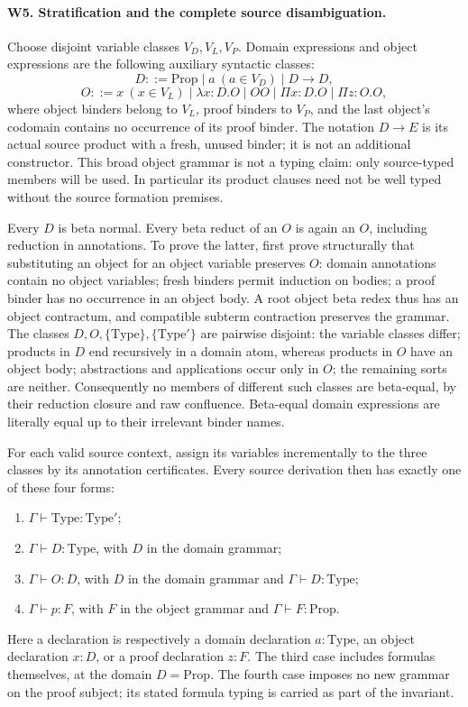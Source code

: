 \paragraph{W5. Stratification and the complete source disambiguation.}
Choose disjoint variable classes \(V_D,V_L,V_P\). Domain expressions and
object expressions are the following auxiliary syntactic classes:
\[
 D ::= \mathrm{Prop}\mid a\ (a\in V_D)\mid D\to D,
\]
\[
 O ::= x\ (x\in V_L)\mid\lambda x:D.O\mid OO
       \mid\Pi x:D.O\mid\Pi z:O.O,
\]
where object binders belong to \(V_L\), proof binders to \(V_P\), and
the last object's codomain contains no occurrence of its proof binder.
The notation \(D\to E\) is its actual source product with a fresh,
unused binder; it is not an additional constructor. This broad object
grammar is not a typing claim: only source-typed members will be used.
In particular its product clauses need not be well typed without the
source formation premises.

Every \(D\) is beta normal. Every beta reduct of an \(O\) is again an
\(O\), including reduction in annotations. To prove the latter, first
prove structurally that substituting an object for an object variable
preserves \(O\): domain annotations contain no object variables;
fresh binders permit induction on bodies; a proof binder has no occurrence
in an object body. A root object beta redex thus has an object contractum,
and compatible subterm contraction preserves the grammar. The classes
\(D,O,\{\mathrm{Type}\},\{\mathrm{Type}'\}\) are pairwise disjoint:
the variable classes differ; products in \(D\) end recursively in a
domain atom, whereas products in \(O\) have an object body; abstractions
and applications occur only in \(O\); the remaining sorts are neither.
Consequently no members of different such classes are beta-equal, by
their reduction closure and raw confluence. Beta-equal domain expressions
are literally equal up to their irrelevant binder names.

For each valid source context, assign its variables incrementally to the
three classes by its annotation certificates. Every source derivation
then has exactly one of these four forms:
\begin{enumerate}
\item \(\Gamma\vdash\mathrm{Type}:\mathrm{Type}'\);
\item \(\Gamma\vdash D:\mathrm{Type}\), with \(D\) in the domain grammar;
\item \(\Gamma\vdash O:D\), with \(D\) in the domain grammar and
      \(\Gamma\vdash D:\mathrm{Type}\);
\item \(\Gamma\vdash p:F\), with \(F\) in the object grammar and
      \(\Gamma\vdash F:\mathrm{Prop}\).
\end{enumerate}
Here a declaration is respectively a domain declaration \(a:\mathrm{Type}\),
an object declaration \(x:D\), or a proof declaration \(z:F\).
The third case includes formulas themselves, at the domain
\(D=\mathrm{Prop}\). The fourth case imposes no new grammar on the
proof subject; its stated formula typing is carried as part of the invariant.

